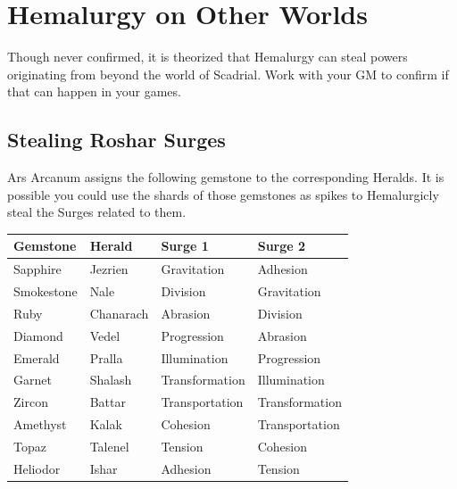 \section{Hemalurgy on Other Worlds}
\label{sec:hemalurgyOtherWorlds}

Though never confirmed, it is theorized that Hemalurgy can steal powers originating from beyond the world of Scadrial. Work with your GM to confirm if that can happen in your games.

\subsection{Stealing Roshar Surges}

Ars Arcanum assigns the following gemstone to the corresponding Heralds. It is possible you could use the shards of those gemstones as spikes to Hemalurgicly steal the Surges related to them. \\

\noindent
\footnotesize
\begin{tabular}{l l l l}
	Gemstone & Herald & Surge 1 & Surge 2 \\ \hline
	
	Sapphire 	& Jezrien 	& Gravitation 		& Adhesion 			\\
	Smokestone 	& Nale 		& Division 			& Gravitation 		\\
	Ruby 		& Chanarach & Abrasion 			& Division 			\\
	Diamond 	& Vedel 	& Progression 		& Abrasion 			\\
	Emerald 	& Pralla 	& Illumination 		& Progression 		\\
	Garnet 		& Shalash 	& Transformation 	& Illumination 		\\
	Zircon 		& Battar 	& Transportation 	& Transformation 	\\
	Amethyst 	& Kalak 	& Cohesion 			& Transportation 	\\
	Topaz 		& Talenel 	& Tension 			& Cohesion 			\\
	Heliodor 	& Ishar 	& Adhesion 			& Tension 			\\
\end{tabular}
\normalsize




